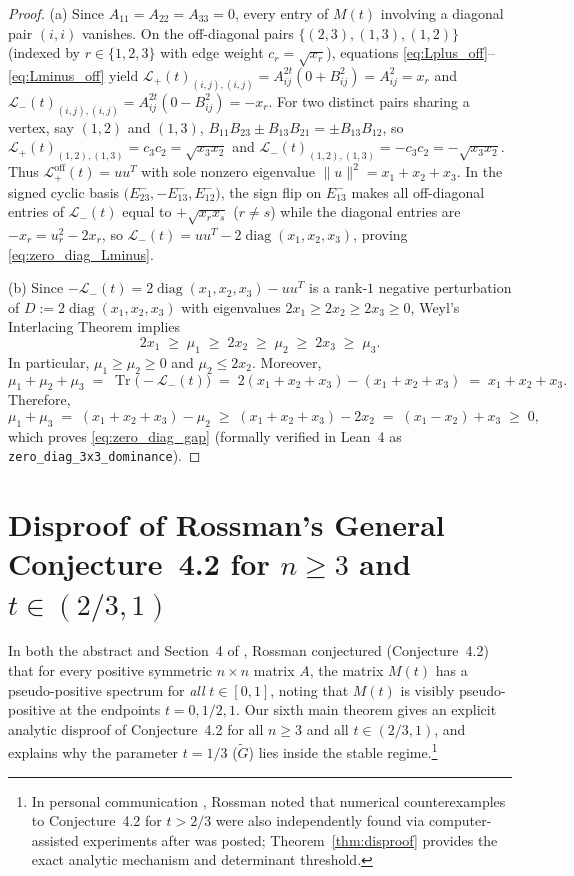 \documentclass[11pt,a4paper]{article}
\theoremstyle{plain}
\theoremstyle{definition}
\theoremstyle{remark}
\DeclareMathOperator{\Tr}{Tr}
\DeclareMathOperator{\diag}{diag}
\begin{document}
\begin{proof}
(a) Since $A_{11} = A_{22} = A_{33} = 0$, every entry of $M(t)$ involving a diagonal pair $(i,i)$ vanishes. On the off-diagonal pairs $\{(2,3),(1,3),(1,2)\}$ (indexed by $r \in \{1,2,3\}$ with edge weight $c_r = \sqrt{x_r}$), equations \eqref{eq:Lplus_off}--\eqref{eq:Lminus_off} yield $\mathcal{L}_+(t)_{(i,j),(i,j)} = A_{ij}^{2t}(0 + B_{ij}^2) = A_{ij}^2 = x_r$ and $\mathcal{L}_-(t)_{(i,j),(i,j)} = A_{ij}^{2t}(0 - B_{ij}^2) = -x_r$. For two distinct pairs sharing a vertex, say $(1,2)$ and $(1,3)$, $B_{11}B_{23} \pm B_{13}B_{21} = \pm B_{13}B_{12}$, so $\mathcal{L}_+(t)_{(1,2),(1,3)} = c_3 c_2 = \sqrt{x_3 x_2}$ and $\mathcal{L}_-(t)_{(1,2),(1,3)} = -c_3 c_2 = -\sqrt{x_3 x_2}$. Thus $\mathcal{L}_+^{\mathrm{off}}(t) = u u^T$ with sole nonzero eigenvalue $\|u\|^2 = x_1 + x_2 + x_3$. In the signed cyclic basis $\big(E_{23}^-, -E_{13}^-, E_{12}^-\big)$, the sign flip on $E_{13}^-$ makes all off-diagonal entries of $\mathcal{L}_-(t)$ equal to $+\sqrt{x_r x_s}$ ($r \ne s$) while the diagonal entries are $-x_r = u_r^2 - 2x_r$, so $\mathcal{L}_-(t) = u u^T - 2\diag(x_1, x_2, x_3)$, proving \eqref{eq:zero_diag_Lminus}.

(b) Since $-\mathcal{L}_-(t) = 2\diag(x_1, x_2, x_3) - u u^T$ is a rank-$1$ negative perturbation of $D := 2\diag(x_1, x_2, x_3)$ with eigenvalues $2x_1 \ge 2x_2 \ge 2x_3 \ge 0$, Weyl's Interlacing Theorem implies
\[
  2x_1 \;\ge\; \mu_1 \;\ge\; 2x_2 \;\ge\; \mu_2 \;\ge\; 2x_3 \;\ge\; \mu_3.
\]
In particular, $\mu_1 \ge \mu_2 \ge 0$ and $\mu_2 \le 2x_2$. Moreover,
\[
  \mu_1 + \mu_2 + \mu_3 \;=\; \Tr\big(-\mathcal{L}_-(t)\big) \;=\; 2(x_1 + x_2 + x_3) - (x_1 + x_2 + x_3) \;=\; x_1 + x_2 + x_3.
\]
Therefore,
\[
  \mu_1 + \mu_3 \;=\; (x_1 + x_2 + x_3) - \mu_2 \;\ge\; (x_1 + x_2 + x_3) - 2x_2 \;=\; (x_1 - x_2) + x_3 \;\ge\; 0,
\]
which proves \eqref{eq:zero_diag_gap} (formally verified in Lean~4 as \texttt{zero\_diag\_3x3\_dominance}).
\end{proof}

\section{Disproof of Rossman's General Conjecture~4.2 for \texorpdfstring{$n \ge 3$}{n >= 3} and \texorpdfstring{$t \in (2/3, 1)$}{t in (2/3, 1)}}\label{sec:disproof}

In both the abstract and Section~4 of \cite{Rossman2025}, Rossman conjectured (Conjecture~4.2) that for every positive symmetric $n \times n$ matrix $A$, the matrix $M(t)$ has a pseudo-positive spectrum for \emph{all} $t \in [0,1]$, noting that $M(t)$ is visibly pseudo-positive at the endpoints $t = 0, 1/2, 1$. Our sixth main theorem gives an explicit analytic disproof of Conjecture~4.2 for all $n \ge 3$ and all $t \in (2/3, 1)$, and explains why the parameter $t = 1/3$ ($\widetilde{G}$) lies inside the stable regime.\footnote{In personal communication \cite{RossmanPersonal2026}, Rossman noted that numerical counterexamples to Conjecture~4.2 for $t > 2/3$ were also independently found via computer-assisted experiments after \cite{Rossman2025} was posted; Theorem~\ref{thm:disproof} provides the exact analytic mechanism and determinant threshold.}
\end{document}
